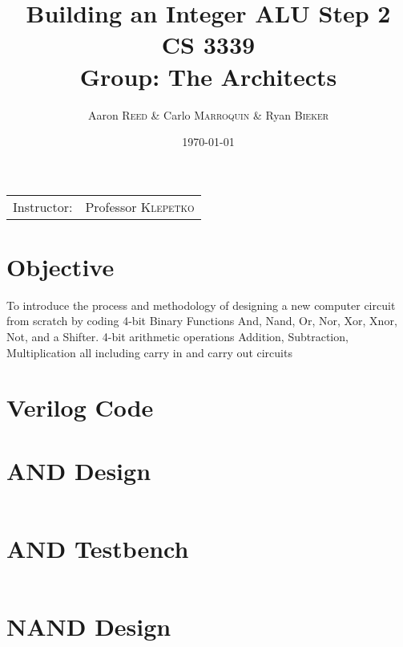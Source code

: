 \documentclass[
	letterpaper, %
	10pt, %
]{CSUniSchoolLabReport}
\title{Building an Integer ALU Step 2\\ CS 3339 \\ Group: The Architects} %
\author{Aaron \textsc{Reed} \& Carlo \textsc{Marroquin} \& Ryan \textsc{Bieker}} %
\date{\today} %
\begin{document}
\maketitle %

\begin{center}
	\begin{tabular}{l r}
		Instructor: & Professor \textsc{Klepetko} %
	\end{tabular}
\end{center}


\section{Objective}

To introduce the process and methodology of designing a new computer circuit from scratch by coding 4-bit Binary Functions And, Nand, Or, Nor, Xor, Xnor, Not, and a Shifter. 4-bit arithmetic operations Addition, Subtraction, Multiplication all including carry in and carry out circuits 

\section{Verilog Code}
\section{AND Design}
\begin{center}
    \inputminted{octave}{verilog/and_4b/and_4b.v}
\end{center}
\section{AND Testbench}
\begin{center}
    \inputminted{octave}{verilog/and_4b/and_4b_test.v}
\end{center}

\section{NAND Design}
\begin{center}
    \inputminted{octave}{verilog/nand_4b/nand_4b.v}
\end{center}
\end{document}
